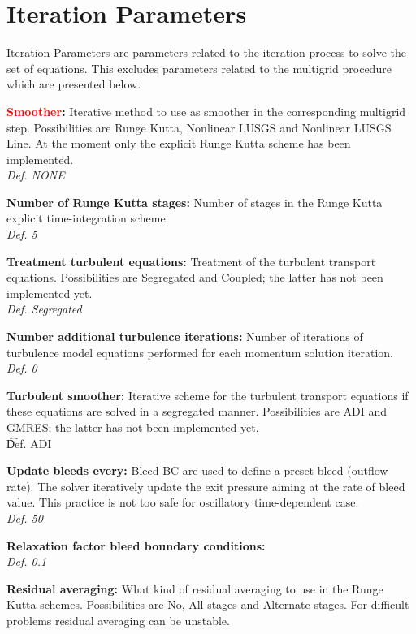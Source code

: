 \documentclass[12pt,epsf,colordvi]{article}
\begin{document}
\section{Iteration Parameters}  \label{sec:iter-par}
% 
Iteration Parameters are parameters related to the iteration process to solve the set of equations. This excludes parameters related to the multigrid procedure which are presented below.
%
\begin{description}
%
      	\item{\bf \textcolor{red}{Smoother}:} Iterative method to use as smoother in the corresponding multigrid step. Possibilities are Runge Kutta, Nonlinear LUSGS and Nonlinear LUSGS Line.  At the moment only the explicit Runge Kutta scheme has been implemented.\\
{\it Def. NONE}
%
    \item{\bf Number of Runge Kutta stages:} Number of stages in the Runge Kutta explicit time-integration scheme. \\
{\it Def.  5}
%
     \item{\bf Treatment turbulent equations:} Treatment of the turbulent transport equations. Possibilities are Segregated and Coupled; the latter has not been implemented yet. \\
{\it Def.  Segregated}
%
     \item{\bf   Number additional turbulence iterations: } Number of iterations of turbulence model equations performed for each momentum solution iteration. \\
{\it Def. 0 }
%
    \item{\bf  Turbulent smoother:} Iterative scheme for the turbulent transport equations if these equations are solved in a segregated manner. Possibilities are ADI and GMRES; the latter has not been implemented yet. \\
{\t Def.  ADI}
%
          \item{\bf  Update bleeds every: } Bleed BC are used to define a preset bleed (outflow rate). The solver iteratively update the exit pressure aiming at the rate of bleed value. This practice is not too safe for oscillatory time-dependent case. \\
{\it Def. 50 }
%
    \item{\bf Relaxation factor bleed boundary conditions:} \\
{\it Def.  0.1}
%
    \item{\bf Residual averaging:} What kind of residual averaging to use in the Runge Kutta schemes. Possibilities are No, All stages and Alternate stages.  For difficult problems residual averaging can be unstable. \\

\end{description}
\end{document}
